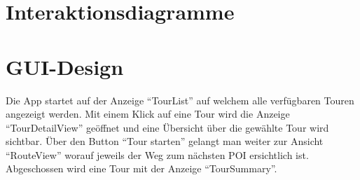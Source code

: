 \documentclass[a4paper,10pt,xetex]{article}
\begin{document}
\section{Interaktionsdiagramme}\label{interaktionsdiagramme}

\section{GUI-Design}\label{gui-design}
Die App startet auf der Anzeige ``TourList'' auf welchem alle verfügbaren Touren angezeigt
werden. Mit einem Klick auf eine Tour wird die Anzeige ``TourDetailView'' geöffnet und eine
Übersicht über die gewählte Tour wird sichtbar. Über den Button ``Tour starten'' gelangt
man weiter zur Ansicht ``RouteView'' worauf jeweils der Weg zum nächsten POI ersichtlich ist.
Abgeschossen wird eine Tour mit der Anzeige ``TourSummary''.

\newpage
\end{document}
